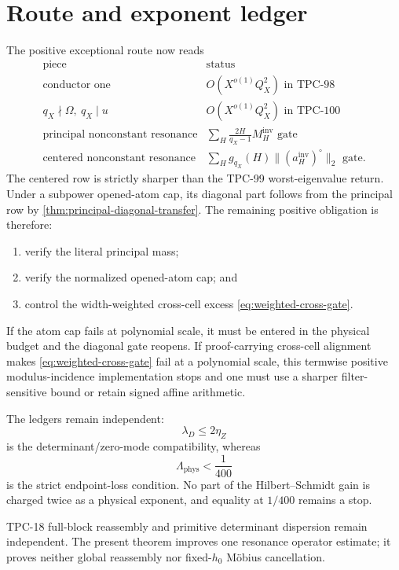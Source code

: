 \section{Route and exponent ledger}
\label{sec:route-ledger}

The positive exceptional route now reads
\[
\begin{array}{c|c}
\text{piece}&\text{status}\\ \hline
\text{conductor one}
 &O(X^{o(1)}Q_X^2)\text{ in TPC-98}\\
q_X\nmid\Omega,\ q_X\mid u
 &O(X^{o(1)}Q_X^2)\text{ in TPC-100}\\
\text{principal nonconstant resonance}
 &\displaystyle\sum_H\frac{2H}{q_X-1}
 M_H^{\mathrm{inv}}\text{ gate}\\
\text{centered nonconstant resonance}
 &\displaystyle\sum_Hg_{q_X}(H)
 \|(a_H^{\mathrm{inv}})^\circ\|_2\text{ gate}.
\end{array}
\]
The centered row is strictly sharper than the TPC-99
worst-eigenvalue return.  Under a subpower opened-atom cap, its
diagonal part follows from the principal row by
\cref{thm:principal-diagonal-transfer}.  The remaining positive
obligation is therefore:
\begin{enumerate}[leftmargin=2em]
\item verify the literal principal mass;
\item verify the normalized opened-atom cap; and
\item control the width-weighted cross-cell excess
  \eqref{eq:weighted-cross-gate}.
\end{enumerate}
If the atom cap fails at polynomial scale, it must be entered in the
physical budget and the diagonal gate reopens.  If proof-carrying
cross-cell alignment makes \eqref{eq:weighted-cross-gate} fail at a
polynomial scale, this termwise positive modulus-incidence
implementation stops and one must use a sharper filter-sensitive
bound or retain signed affine arithmetic.

The ledgers remain independent:
\[
 \lambda_D\le2\eta_Z
\]
is the determinant/zero-mode compatibility, whereas
\[
 \Lambda_{\mathrm{phys}}<\frac1{400}
\]
is the strict endpoint-loss condition.  No part of the
Hilbert--Schmidt gain is charged twice as a physical exponent, and
equality at \(1/400\) remains a stop.

TPC-18 full-block reassembly and primitive determinant dispersion
remain independent.  The present theorem improves one resonance
operator estimate; it proves neither global reassembly nor
fixed-\(h_0\) M\"obius cancellation.
